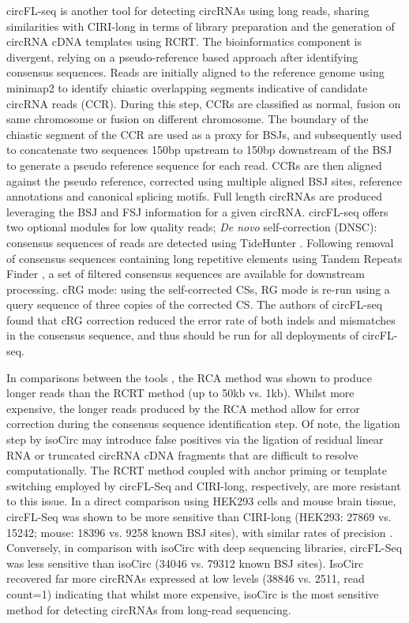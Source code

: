 \documentclass[pdflatex,sn-mathphys-num]{sn-jnl}
\begin{document}
circFL-seq \cite{circFLseq} is another tool for detecting circRNAs using long reads, sharing similarities with CIRI-long in terms of library preparation and the generation of circRNA cDNA templates using RCRT. The bioinformatics component is divergent, relying on a pseudo-reference based approach after identifying consensus sequences. Reads are initially aligned to the reference genome using minimap2 to identify chiastic overlapping segments indicative of candidate circRNA reads (CCR). During this step, CCRs are classified as normal, fusion on same chromosome or fusion on different chromosome. The boundary of the chiastic segment of the CCR are used as a proxy for BSJs, and subsequently used to concatenate two sequences 150bp upstream to 150bp downstream of the BSJ to generate a pseudo reference sequence for each read. CCRs are then aligned against the pseudo reference, corrected using multiple aligned BSJ sites, reference annotations and canonical splicing motifs. Full length circRNAs are produced leveraging the BSJ and FSJ information for a given circRNA. circFL-seq offers two optional modules for low quality reads; \textit{De novo} self-correction (DNSC): consensus sequences of reads are detected using TideHunter \cite{Gao2019Jul}. Following removal of consensus sequences containing long repetitive elements using Tandem Repeats Finder \cite{Benson1999Jan}, a set of filtered consensus sequences are available for downstream processing. cRG mode: using the self-corrected CSs, RG mode is re-run using a query sequence of three copies of the corrected CS. The authors of circFL-seq found that cRG correction reduced the error rate of both indels and mismatches in the consensus sequence, and thus should be run for all deployments of circFL-seq.\par 

In comparisons between the tools \cite{circFLseq,Rahimi2021Dec}, the RCA method was shown to produce longer reads than the RCRT method (up to 50kb vs. 1kb). Whilst more expensive, the longer reads produced by the RCA method allow for error correction during the consensus sequence identification step. Of note, the ligation step by isoCirc may introduce false positives via the ligation of residual linear RNA or truncated circRNA cDNA fragments that are difficult to resolve computationally. The RCRT method coupled with anchor priming or template switching employed by circFL-Seq and CIRI-long, respectively, are more resistant to this issue. In a direct comparison using HEK293 cells and mouse brain tissue, circFL-Seq was shown to be more sensitive than CIRI-long (HEK293: 27869 vs. 15242; mouse: 18396 vs. 9258 known BSJ sites), with similar rates of precision \cite{circFLseq}. Conversely, in comparison with isoCirc with deep sequencing libraries, circFL-Seq was less sensitive than isoCirc (34046 vs. 79312 known BSJ sites). IsoCirc recovered far more circRNAs expressed at low levels (38846 vs. 2511, read count=1) indicating that whilst more expensive, isoCirc is the most sensitive method for detecting circRNAs from long-read sequencing.
\end{document}
